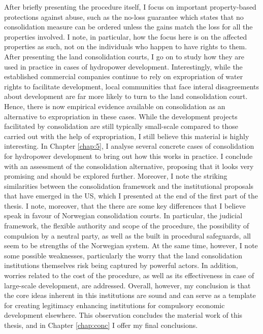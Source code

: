 After briefly presenting the procedure itself, I focus on important property-based protections against abuse, such as the no-loss guarantee which states that no consolidation measure can be ordered unless the gains match the loss for all the properties involved. I note, in particular, how the focus here is on the affected properties as such, not on the individuals who happen to have rights to them. After presenting the land consolidation courts, I go on to study how they are used in practice in cases of hydropower development. Interestingly, while the established commercial companies continue to rely on expropriation of water rights to facilitate development, local communities that face interal disagreements about development are far more likely to turn to the land consolidation court. Hence, there is now empirical evidence available on consolidation as an alternative to expropriation in these cases. While the development projects facilitated by consolidation are still typically small-scale compared to those carried out with the help of expropriation, I still believe this material is highly interesting. In Chapter \ref{chap:5}, I analyse several concrete cases of consolidation for hydropower development to bring out how this works in practice. I conclude with an assessment of the consolidation alternative, proposing that it looks very promising and should be explored further. Moreover, I note the striking similarities between the consolidation framework and the institutional proposals that have emerged in the US, which I presented at the end of the first part of the thesis. I note, moreover, that the there are some key differences that I believe speak in favour of Norwegian consolidation courts. In particular, the judicial framework, the flexible authority and scope of the procedure, the possibility of compulsion by a neutral party, as well as the built in procedural safeguards, all seem to be strengths of the Norwegian system. At the same time, however, I note some possible weaknesses, particularly the worry that the land consolidation institutions themselves risk being captured by powerful actors. In addition, worries related to the cost of the procedure, as well as its effectiveness in case of large-scale development, are addressed. Overall, however, my conclusion is that the core ideas inherent in this institutions are sound and can serve as a template for creating legitimacy enhancing institutions for compulsory economic development elsewhere. This observation concludes the material work of this thesis, and in Chapter \ref{chap:conc} I offer my final conclusions.

